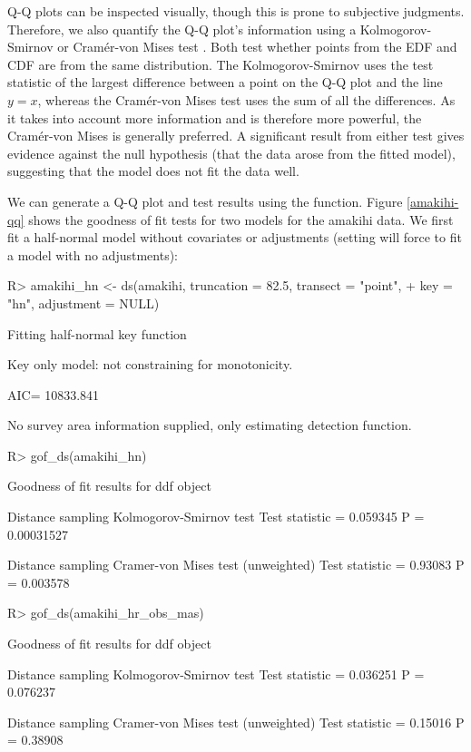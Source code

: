 \documentclass[article]{jss}\usepackage[]{graphicx}\usepackage[]{color}
\begin{document}
Q-Q plots can be inspected visually, though this is prone to subjective judgments. Therefore, we also quantify the Q-Q plot's information using a Kolmogorov-Smirnov or Cram\'{e}r-von Mises test \citep{Burnham:2004vd}. Both test whether points from the EDF and CDF are from the same distribution. The Kolmogorov-Smirnov uses the test statistic of the largest difference between a point on the Q-Q plot and the line $y=x$, whereas the Cram\'{e}r-von Mises test uses the sum of all the differences. As it takes into account more information and is therefore more powerful, the Cram\'{e}r-von Mises is generally preferred. A significant result from either test gives evidence against the null hypothesis (that the data arose from the fitted model), suggesting that the model does not fit the data well. 

We can generate a Q-Q plot and test results using the  function. Figure \ref{amakihi-qq} shows the goodness of fit tests for two models for the amakihi data. We first fit a half-normal model without covariates or adjustments (setting  will force  to fit a model with no adjustments):
\begin{Schunk}
\begin{Sinput}
R> amakihi_hn <- ds(amakihi, truncation = 82.5, transect = "point",
+                  key = "hn", adjustment = NULL)
\end{Sinput}
\begin{Soutput}
Fitting half-normal key function
\end{Soutput}
\begin{Soutput}
Key only model: not constraining for monotonicity.
\end{Soutput}
\begin{Soutput}
AIC= 10833.841
\end{Soutput}
\begin{Soutput}
No survey area information supplied, only estimating detection function.
\end{Soutput}
\begin{Sinput}
R> gof_ds(amakihi_hn)
\end{Sinput}
\begin{Soutput}

Goodness of fit results for ddf object

Distance sampling Kolmogorov-Smirnov test
Test statistic =  0.059345  P =  0.00031527 

Distance sampling Cramer-von Mises test (unweighted)
Test statistic =  0.93083  P =  0.003578 
\end{Soutput}
\begin{Sinput}
R> gof_ds(amakihi_hr_obs_mas)
\end{Sinput}
\begin{Soutput}

Goodness of fit results for ddf object

Distance sampling Kolmogorov-Smirnov test
Test statistic =  0.036251  P =  0.076237 

Distance sampling Cramer-von Mises test (unweighted)
Test statistic =  0.15016  P =  0.38908 
\end{Soutput}
\end{Schunk}
\end{document}
